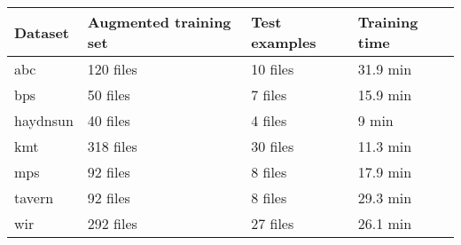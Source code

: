 \begin{tabular}{l|lll}
Dataset        & Augmented training set & Test examples & Training time \\ \hline
\gls{abc}      & 120 files                   & 10 files           & 31.9 min      \\
\gls{bps}      & 50  files                   & 7  files           & 15.9 min      \\
\gls{haydnsun} & 40  files                   & 4  files           & 9 min         \\
\gls{kmt}      & 318 files                   & 30 files           & 11.3 min      \\
\gls{mps}      & 92  files                   & 8  files           & 17.9 min      \\
\gls{tavern}   & 92  files                   & 8  files           & 29.3 min      \\
\gls{wir}      & 292 files                   & 27 files           & 26.1 min     
\end{tabular}
